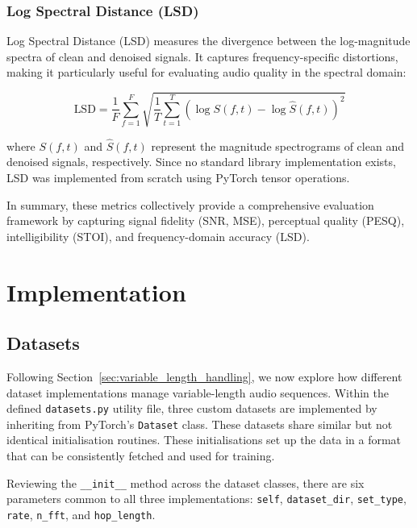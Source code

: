 \subsection{Log Spectral Distance (LSD)}
\label{subsec:lsd}

Log Spectral Distance (LSD) measures the divergence between the log-magnitude spectra of clean and denoised signals. It captures frequency-specific distortions, making it particularly useful for evaluating audio quality in the spectral domain:

\begin{equation}
\text{LSD} = \frac{1}{F} \sum_{f=1}^{F} \sqrt{ \frac{1}{T} \sum_{t=1}^{T} \left( \log S(f, t) - \log \hat{S}(f, t) \right)^2 }
\end{equation}

where $S(f, t)$ and $\hat{S}(f, t)$ represent the magnitude spectrograms of clean and denoised signals, respectively. Since no standard library implementation exists, LSD was implemented from scratch using PyTorch tensor operations.

\vspace{1em}
In summary, these metrics collectively provide a comprehensive evaluation framework by capturing signal fidelity (SNR, MSE), perceptual quality (PESQ), intelligibility (STOI), and frequency-domain accuracy (LSD).



\graphicspath{{content/chapters/6_implementation/figures/}}
\chapter{Implementation}
\label{chp:implementation}

\section{Datasets}
\label{sec:datasets}

Following Section~\ref{sec:variable_length_handling}, we now explore how different dataset implementations manage variable-length audio sequences. Within the defined \texttt{datasets.py} utility file, three custom datasets are implemented by inheriting from PyTorch’s \texttt{Dataset} class. These datasets share similar but not identical initialisation routines. These initialisations set up the data in a format that can be consistently fetched and used for training.

Reviewing the \texttt{\_\_init\_\_} method across the dataset classes, there are six parameters common to all three implementations: \texttt{self}, \texttt{dataset\_dir}, \texttt{set\_type}, \texttt{rate}, \texttt{n\_fft}, and \texttt{hop\_length}.

